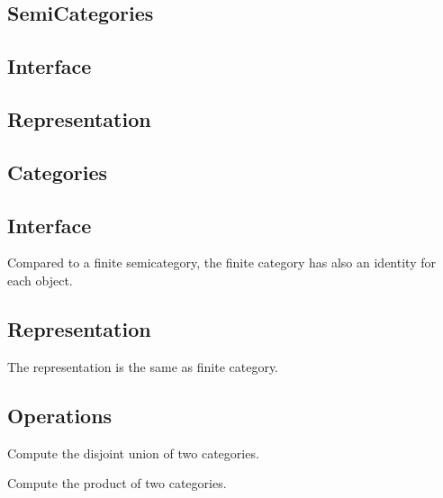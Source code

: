 
\subsection{SemiCategories}
\subsection*{Interface}

\subsection*{Representation}

\subsection{Categories}
\subsection*{Interface}
Compared to a finite semicategory, the finite category has also an identity for each object.

\subsection*{Representation}

The representation is the same as finite category.

\subsection*{Operations}

\begin{codeexercise}
    Compute the disjoint union of two categories.

\end{codeexercise}

\begin{codeexercise}
    Compute the product of two categories.

\end{codeexercise}

